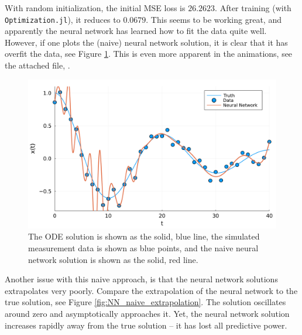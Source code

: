 \documentclass[10pt,a4paper]{article}
\begin{document}
With random initialization, the initial MSE loss is $26.2623$. After training (with \texttt{Optimization.jl}), it reduces to $0.0679$.
This seems to be working great, and apparently the neural network has learned how to fit the data quite well.
However, if one plots the (naive) neural network solution, it is clear that it has overfit the data, see Figure \ref{fig:NN_naive}.
This is even more apparent in the animations, see the attached file, .

\begin{figure}[H]
    \includegraphics[width=\linewidth]{no_ode.pdf}
    \caption{The ODE solution is shown as the solid, blue line,
        the simulated measurement data is shown as blue points,
        and the naive neural network solution is shown as the solid, red line.}
    \label{fig:NN_naive}
\end{figure}

Another issue with this naive approach, is that the neural network solutions extrapolates very poorly.
Compare the extrapolation of the neural network to the true solution, see Figure \ref{fig:NN_naive_extrapolation}.
The solution oscillates around zero and asymptotically approaches it.
Yet, the neural network solution increases rapidly away from the true solution -- it has lost all predictive power.
\end{document}
